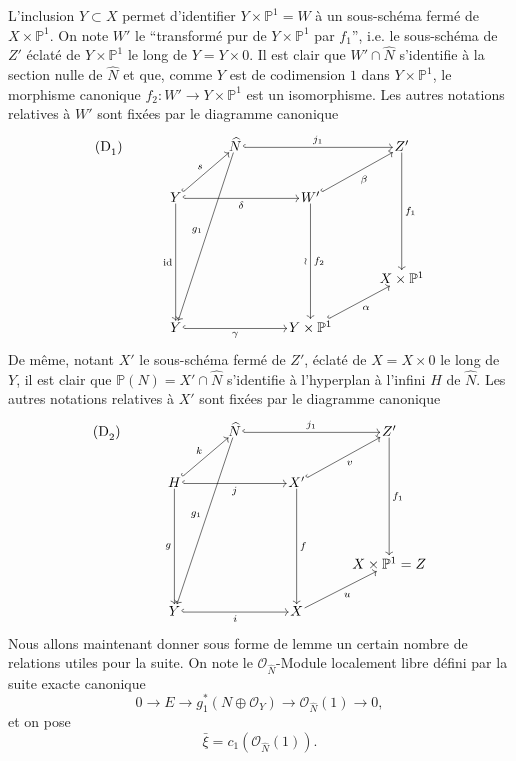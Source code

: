 \documentclass[11pt]{article}
\begin{document}
L'inclusion $Y\subset X$ permet d'identifier $Y\times\mathbb P^1=W$ à un sous-schéma fermé de $X\times\mathbb P^1$. On note $W'$ le ``transformé pur de $Y\times\mathbb P^1$ par $f_1$'', i.e. le sous-schéma de $Z'$ éclaté de $Y\times\mathbb P^1$ le long de $Y=Y\times0$. Il est clair que $W'\cap\widehat N$ s'identifie à la section nulle de $\widehat N$ et que, comme $Y$ est de codimension $1$ dans $Y\times\mathbb P^1$, le morphisme canonique $f_2:W'\to Y\times\mathbb P^1$ est un isomorphisme. Les autres notations relatives à $W'$ sont fixées par le diagramme canonique
\[
\begin{tikzcd}[column sep=3.2em,row sep=2.4em,cells={nodes={inner sep=1pt}}]
\text{(D}_1\text{)}\arrow[from=1-3,to=5-2,"g_1"']
& & \widehat N \arrow[rr,hook,"j_1"] & & Z' \arrow[ddd,"f_1"] \\
& Y \arrow[ur,hook,"s"] \arrow[rr,hook,"\delta"'] \arrow[ddd,"\mathrm{id}"'] & &
W' \arrow[ur,hook,"\beta"'] \arrow[ddd,"\wr"',"f_2"] & \\
& & & & \\
& & & & X\times\mathbb P^1 \\
& Y \arrow[rr,hook,"\gamma"'] & & Y\times\mathbb P^1 \arrow[ur,hook,"\alpha"'] &
\end{tikzcd}
\]
De même, notant $X'$ le sous-schéma fermé de $Z'$, éclaté de $X=X\times0$ le long de $Y$, il est
clair que $\mathbb P(N)=X'\cap\widehat N$ s'identifie à l'hyperplan à l'infini $H$ de $\widehat N$. Les autres notations relatives à $X'$ sont fixées par le diagramme canonique
\[
\begin{tikzcd}[column sep=3.2em,row sep=2.4em,cells={nodes={inner sep=1pt}}]
\text{(D}_2\text{)}\arrow[from=1-3,to=5-2,"g_1"']
& & \widehat N \arrow[rr,hook,"j_1"] & & Z' \arrow[ddd,"f_1"] \\
& H \arrow[ur,hook,"k"] \arrow[rr,hook,"j"'] \arrow[ddd,"g"'] & &
X' \arrow[ur,hook,"v"'] \arrow[ddd,"f"] & \\
& & & & \\
& & & & X\times\mathbb P^1=Z \\
& Y \arrow[rr,hook,"i"'] & & X \arrow[ur,"u"'] &
\end{tikzcd}
\]
Nous allons maintenant donner sous forme de lemme un certain nombre de relations utiles pour la suite. On note le $\mathcal O_{\widehat N}$-Module localement libre défini par la suite exacte canonique
\[
0\to E\to g_1^*(N\oplus\mathcal O_Y)\to\mathcal O_{\widehat N}(1)\to0,
\tag{9.3.0}
\]
et on pose
\[
\bar\xi=c_1(\mathcal O_{\widehat N}(1)).
\tag{9.3.1}
\]
\end{document}
